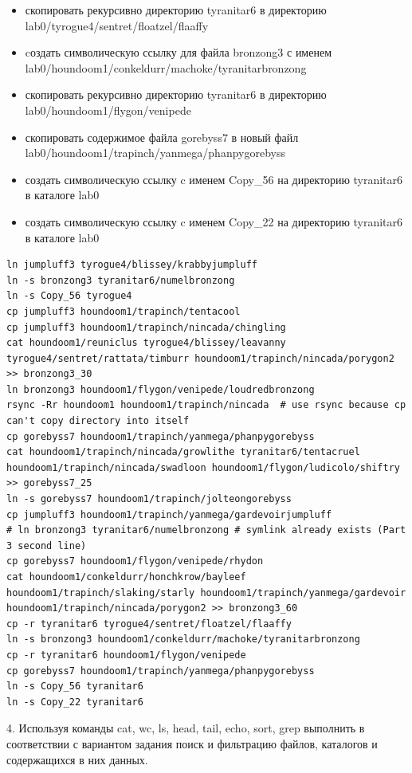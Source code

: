 \documentclass{article}
\begin{document}
\begin{itemize}
  \item скопировать рекурсивно директорию tyranitar6 в директорию lab0/tyrogue4/sentret/floatzel/flaaffy
  \item cоздать символическую ссылку для файла bronzong3 с именем lab0/houndoom1/conkeldurr/machoke/tyranitarbronzong
  \item скопировать рекурсивно директорию tyranitar6 в директорию lab0/houndoom1/flygon/venipede
  \item скопировать содержимое файла gorebyss7 в новый файл lab0/houndoom1/trapinch/yanmega/phanpygorebyss
  \item создать символическую ссылку c именем Copy\_56 на директорию tyranitar6 в каталоге lab0
  \item создать символическую ссылку c именем Copy\_22 на директорию tyranitar6 в каталоге lab0
\end{itemize}

\begin{lstlisting}
ln jumpluff3 tyrogue4/blissey/krabbyjumpluff
ln -s bronzong3 tyranitar6/numelbronzong
ln -s Copy_56 tyrogue4
cp jumpluff3 houndoom1/trapinch/tentacool
cp jumpluff3 houndoom1/trapinch/nincada/chingling
cat houndoom1/reuniclus tyrogue4/blissey/leavanny tyrogue4/sentret/rattata/timburr houndoom1/trapinch/nincada/porygon2 >> bronzong3_30
ln bronzong3 houndoom1/flygon/venipede/loudredbronzong
rsync -Rr houndoom1 houndoom1/trapinch/nincada  # use rsync because cp can't copy directory into itself
cp gorebyss7 houndoom1/trapinch/yanmega/phanpygorebyss
cat houndoom1/trapinch/nincada/growlithe tyranitar6/tentacruel houndoom1/trapinch/nincada/swadloon houndoom1/flygon/ludicolo/shiftry >> gorebyss7_25
ln -s gorebyss7 houndoom1/trapinch/jolteongorebyss
cp jumpluff3 houndoom1/trapinch/yanmega/gardevoirjumpluff
# ln bronzong3 tyranitar6/numelbronzong # symlink already exists (Part 3 second line)
cp gorebyss7 houndoom1/flygon/venipede/rhydon
cat houndoom1/conkeldurr/honchkrow/bayleef houndoom1/trapinch/slaking/starly houndoom1/trapinch/yanmega/gardevoir houndoom1/trapinch/nincada/porygon2 >> bronzong3_60
cp -r tyranitar6 tyrogue4/sentret/floatzel/flaaffy
ln -s bronzong3 houndoom1/conkeldurr/machoke/tyranitarbronzong
cp -r tyranitar6 houndoom1/flygon/venipede
cp gorebyss7 houndoom1/trapinch/yanmega/phanpygorebyss
ln -s Copy_56 tyranitar6
ln -s Copy_22 tyranitar6
\end{lstlisting}
\newpage

4. Используя команды cat, wc, ls, head, tail, echo, sort, grep выполнить в соответствии с вариантом задания поиск и фильтрацию файлов, каталогов и содержащихся в них данных.
\end{document}
